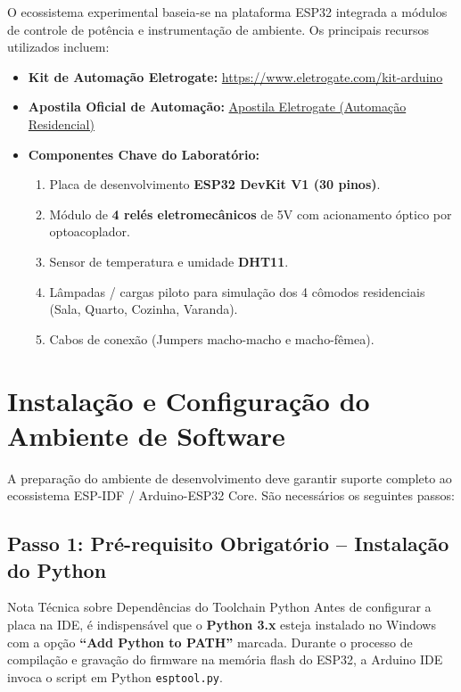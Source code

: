 \documentclass[a4paper,11pt]{article}
\begin{document}
O ecossistema experimental baseia-se na plataforma ESP32 integrada a módulos de controle de potência e instrumentação de ambiente. Os principais recursos utilizados incluem:
\begin{itemize}[leftmargin=*]
    \item \textbf{Kit de Automação Eletrogate:} \url{https://www.eletrogate.com/kit-arduino}
    \item \textbf{Apostila Oficial de Automação:} \href{https://conteudo.eletrogate.com/apostila-automacao-residencial}{Apostila Eletrogate (Automação Residencial)}
    \item \textbf{Componentes Chave do Laboratório:}
    \begin{enumerate}
        \item Placa de desenvolvimento \textbf{ESP32 DevKit V1 (30 pinos)}.
        \item Módulo de \textbf{4 relés eletromecânicos} de 5V com acionamento óptico por optoacoplador.
        \item Sensor de temperatura e umidade \textbf{DHT11}.
        \item Lâmpadas / cargas piloto para simulação dos 4 cômodos residenciais (Sala, Quarto, Cozinha, Varanda).
        \item Cabos de conexão (Jumpers macho-macho e macho-fêmea).
    \end{enumerate}
\end{itemize}

\section{Instalação e Configuração do Ambiente de Software}

A preparação do ambiente de desenvolvimento deve garantir suporte completo ao ecossistema ESP-IDF / Arduino-ESP32 Core. São necessários os seguintes passos:

\subsection{Passo 1: Pré-requisito Obrigatório -- Instalação do Python}
\begin{warnbox}{Nota Técnica sobre Dependências do Toolchain Python}
Antes de configurar a placa na IDE, é indispensável que o \textbf{Python 3.x} esteja instalado no Windows com a opção \textbf{``Add Python to PATH''} marcada. Durante o processo de compilação e gravação do firmware na memória flash do ESP32, a Arduino IDE invoca o script em Python \texttt{esptool.py}.
\end{warnbox}
\end{document}

